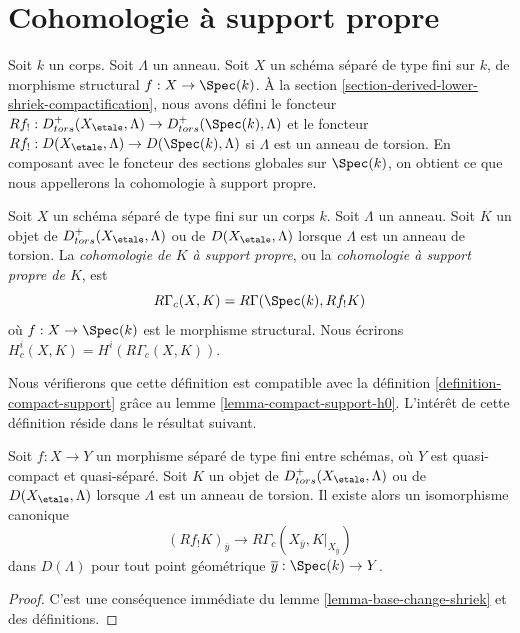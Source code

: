 \section{Cohomologie à support propre}
\label{section-compactly-supported-cohomology}

\noindent
Soit $k$ un corps. Soit $\Lambda$ un anneau. Soit $X$ un schéma séparé
de type fini sur $k$, de morphisme structural $f : X \to \Spec(k)$.
À la section \ref{section-derived-lower-shriek-compactification},
nous avons défini le foncteur
$Rf_! : D^+_{tors}(X_\etale, \Lambda) \to D^+_{tors}(\Spec(k), \Lambda)$
et le foncteur $Rf_! : D(X_\etale, \Lambda) \to D(\Spec(k), \Lambda)$
si $\Lambda$ est un anneau de torsion. En composant avec le foncteur des sections globales
sur $\Spec(k)$, on obtient ce que nous appellerons la cohomologie à support propre.

\begin{definition}
\label{definition-cohomology-compact-support}
Soit $X$ un schéma séparé de type fini sur un corps $k$.
Soit $\Lambda$ un anneau. Soit $K$ un objet de
$D^+_{tors}(X_\etale, \Lambda)$
ou de $D(X_\etale, \Lambda)$ lorsque $\Lambda$ est un anneau de torsion.
La {\it cohomologie de $K$ à support propre}, ou la
{\it cohomologie à support propre de $K$}, est
$$
R\Gamma_c(X, K) = R\Gamma(\Spec(k), Rf_!K)
$$
où $f : X \to \Spec(k)$ est le morphisme structural. Nous
écrirons $H^i_c(X, K) = H^i(R\Gamma_c(X, K))$.
\end{definition}

\noindent
Nous vérifierons que cette définition est compatible avec la
définition \ref{definition-compact-support} grâce au
lemme \ref{lemma-compact-support-h0}.
L'intérêt de cette définition réside dans le résultat suivant.

\begin{lemma}
\label{lemma-stalk-R-f-shriek}
Soit $f : X \to Y$ un morphisme séparé de type fini entre schémas,
où $Y$ est quasi-compact et quasi-séparé. Soit $K$ un objet de
$D^+_{tors}(X_\etale, \Lambda)$ ou de $D(X_\etale, \Lambda)$ lorsque
$\Lambda$ est un anneau de torsion. Il existe alors un isomorphisme canonique
$$
(Rf_!K)_{\overline{y}}
\longrightarrow
R\Gamma_c(X_{\overline{y}}, K|_{X_{\overline{y}}})
$$
dans $D(\Lambda)$ pour tout point géométrique $\overline{y} : \Spec(k) \to Y$.
\end{lemma}

\begin{proof}
C'est une conséquence immédiate du lemme \ref{lemma-base-change-shriek} et des
définitions.
\end{proof}


